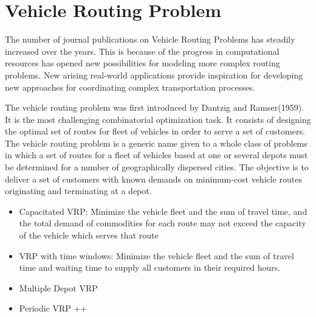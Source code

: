 \section{Vehicle Routing Problem}

The number of journal publications on Vehicle Routing Problems has steadily increased over the years. This is because of the progress in computational resources has opened new possibilities for modeling more complex routing problems. New arising real-world applications provide inspiration for developing new approaches for coordinating complex transportation processes.  \citep{vehiclerouting}

The vehicle routing problem was first introduced by Dantzig and Ramser(1959). 
It is the most challenging combinatorial optimization task. It consists of designing the optimal set of routes for fleet of vehicles in order to serve a set of customers. The vehicle routing problem is a generic name given to a whole class of problems in which a set of routes for a fleet of vehicles based at one or several depots must be determined for a number of geographically dispersed cities. The objective is to deliver a set of customers with known demands on minimum-cost vehicle routes originating and terminating at a depot. 

\begin{itemize}
\item Capacitated VRP: Minimize the vehicle fleet and the sum of travel time, and the total demand of commodities for each route may not exceed the capacity of the vehicle which serves that route
\item VRP with time windows: Minimize the vehicle fleet and the sum of travel time and waiting time to supply all customers in their required hours.
\item Multiple Depot VRP
\item Periodic VRP ++ 
\end{itemize}

